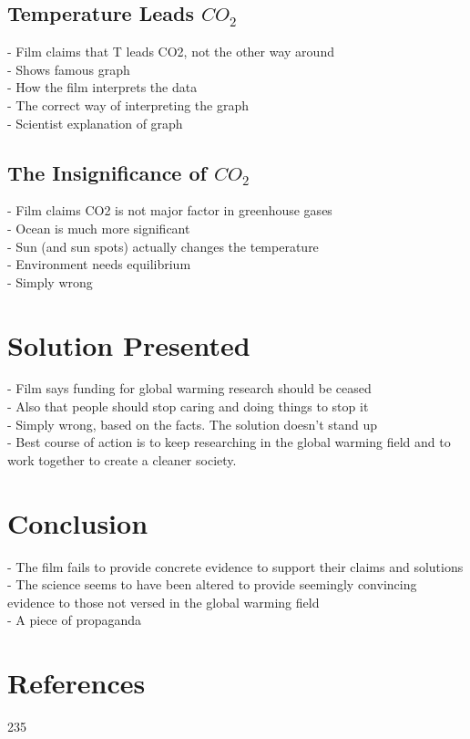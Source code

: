 \documentclass[12pt]{article}
\begin{document}
\subsection{Temperature Leads $CO_2$}
	- Film claims that T leads CO2, not the other way around\\
	- Shows famous graph\\
	- How the film interprets the data\\
	- The correct way of interpreting the graph\\
	- Scientist explanation of graph\\
\subsection{The Insignificance of $CO_2$}
	- Film claims CO2 is not major factor in greenhouse gases\\
	- Ocean is much more significant\\
	- Sun (and sun spots) actually changes the temperature\\
	- Environment needs equilibrium\\
	- Simply wrong \\
\section{Solution Presented}
	- Film says funding for global warming research should be ceased\\
	- Also that people should stop caring and doing things to stop it\\
	- Simply wrong, based on the facts. The solution doesn't stand up\\
	- Best course of action is to keep researching in the global warming field and to work together to create a cleaner society.\\
\section{Conclusion}
	- The film fails to provide concrete evidence to support their claims and solutions\\
	- The science seems to have been altered to provide seemingly convincing evidence to those not versed in the global warming field \\
	- A piece of propaganda \\
\section{References}
235
\end{document}
